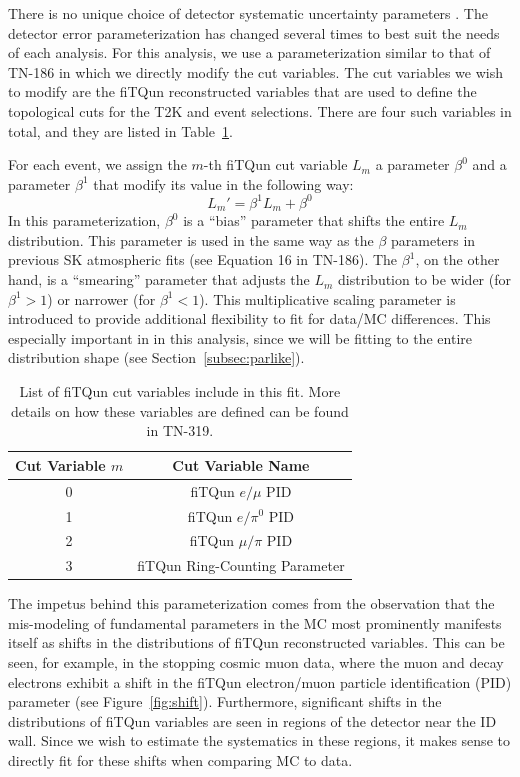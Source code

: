 There is no unique choice of detector systematic uncertainty parameters \ldsk.
The detector error parameterization has changed several times to best suit the
needs of each analysis. For this analysis, we use a parameterization
similar to that of TN-186 in which we directly modify the cut variables.  The
cut variables we wish to modify are the fiTQun reconstructed variables that are
used to define the topological cuts for the T2K \nue and \numu event
selections.  There are four such variables in total, and they are listed
in Table~\ref{tab:fqvars}.

For each event, we assign the $m$-th fiTQun cut variable $L_{m}$ a parameter
$\beta^{0}$ and a parameter $\beta^{1}$ that modify its value in the following
way:
%
\begin{equation}
  \label{eq:fqparmod}
  L_{m}' = \beta^{1} L_{m} + \beta^{0}
\end{equation}
%
In this parameterization, $\beta^{0}$ is a ``bias'' parameter that shifts the
entire $L_{m}$ distribution.  This parameter is used in the same way as the
$\beta$ parameters in previous SK atmospheric fits (see Equation 16 in TN-186).
The $\beta^{1}$, on the other hand, is a ``smearing'' parameter that adjusts
the $L_{m}$ distribution to be wider (for $\beta^{1} > 1$) or narrower (for
$\beta^{1} < 1$).  This multiplicative scaling parameter is introduced to
provide additional flexibility to fit for data/MC differences.  This especially
important in in this analysis, since we will be fitting to the entire
distribution shape (see Section~\ref{subsec:parlike}).

\begin{table}
  \centering
  \begin{tabular}{c | c}
    \hline\hline
    Cut Variable $m$ & Cut Variable  Name \\
    \hline
    0 & fiTQun $e/\mu$ PID \\
    1 & fiTQun $e/\pi^{0}$ PID \\
    2 & fiTQun $\mu/\pi$ PID \\
    3 & fiTQun Ring-Counting Parameter \\
    \hline\hline
  \end{tabular}
  \caption{List of fiTQun cut variables include in this fit.  More details on
  how these variables are defined can be found in TN-319.}
  \label{tab:fqvars}
\end{table}

The impetus behind this parameterization comes from the observation that the
mis-modeling of fundamental parameters in the MC most prominently manifests
itself as shifts in the distributions of fiTQun reconstructed variables. This
can be seen, for example, in the stopping cosmic muon data, where the muon and
decay electrons exhibit a shift in the fiTQun electron/muon particle
identification (PID) parameter (see Figure~\ref{fig:shift}).  Furthermore,
significant shifts in the distributions of fiTQun variables are seen in regions
of the detector near the ID wall.  Since we wish to estimate the systematics in
these regions, it makes sense to directly fit for these shifts when comparing
MC to data. 

